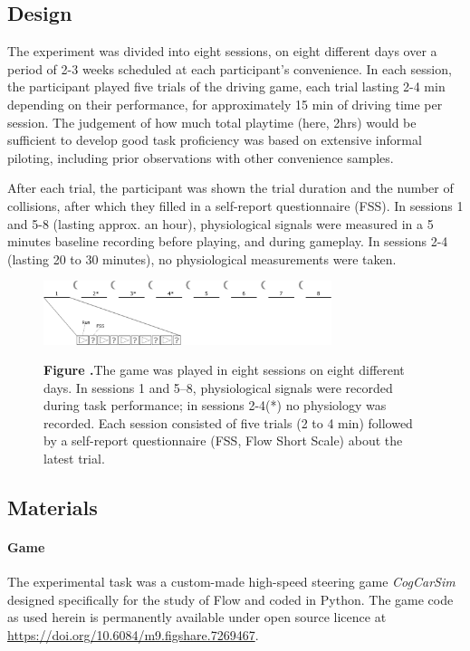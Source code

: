 \documentclass{frontierstyle/frontiersSCNS}
\newcommand{\nicewidth}{0.75\textwidth}
\newcommand{\tapprx}{\raisebox{0.4ex}{\texttildelow}}
\begin{document}
\subsection{Design}
The experiment was divided into eight sessions, on eight different days over a period of 2-3 weeks scheduled at each participant's convenience. In each session, the participant played five trials of the driving game, each trial lasting 2-4 min depending on their performance, for approximately 15 min of driving time per session. The judgement of how much total playtime (here, \tapprx2hrs) would be sufficient to develop good task proficiency was based on extensive informal piloting, including prior observations with other convenience samples.

After each trial, the participant was shown the trial duration and the number of collisions, after which they filled in a self-report questionnaire (FSS). In sessions 1 and 5-8 (lasting approx. an hour), physiological signals were measured in a 5 minutes baseline recording before playing, and during gameplay. In sessions 2-4 (lasting 20 to 30 minutes), no physiological measurements were taken.

\begin{figure}[!ht]
\begin{center}
  \includegraphics[width=\nicewidth]{2_design}
\end{center}
  \textbf{\label{fig:design} Figure .}{The game was played in eight sessions on eight different days. In sessions 1 and 5--8, physiological signals were recorded during task performance; in sessions 2-4(*) no physiology was recorded. Each session consisted of five trials (2 to 4 min) followed by a self-report questionnaire (FSS, Flow Short Scale) about the latest trial.}
\end{figure}

\subsection{Materials}
\paragraph*{Game} The experimental task was a custom-made high-speed steering game {\it CogCarSim} designed specifically for the study of Flow and coded in Python. The game code as used herein is permanently available under open source licence at \url{https://doi.org/10.6084/m9.figshare.7269467}.
\end{document}
